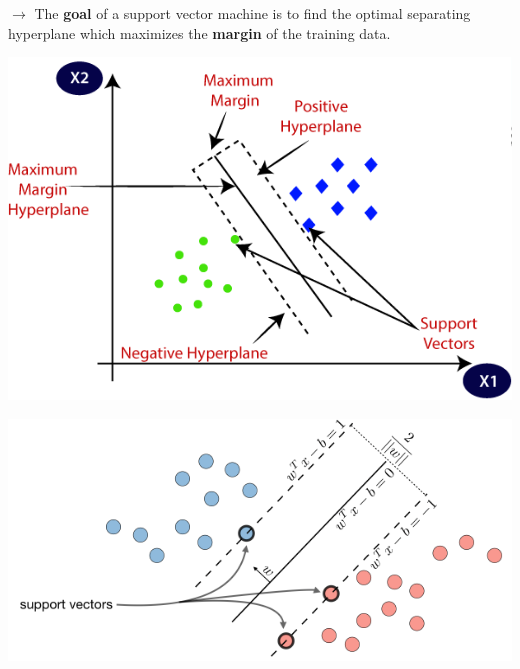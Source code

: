\documentclass[letterpaper, 10.5pt,landscape]{article}
\begin{document}
\begin{multicols*}{3}

\vspace{3pt}
$\rightarrow$ The \textbf{goal} of a support vector machine is to find the optimal separating hyperplane which maximizes the \textbf{margin} of the training data.

\vspace{-10pt}
\begin{center}
    \begin{minipage}{0.65\linewidth}
    \includegraphics[width=\textwidth]{figures/svm_figure.PNG}
    \end{minipage}
\end{center}

\vspace{-10pt}

\begin{center}
    \begin{minipage}{0.8\linewidth}
    \includegraphics[width=\textwidth]{figures/svm_figures2.PNG}
    \end{minipage}
\end{center}
\vspace{-5pt}


\end{multicols*}
\end{document}
